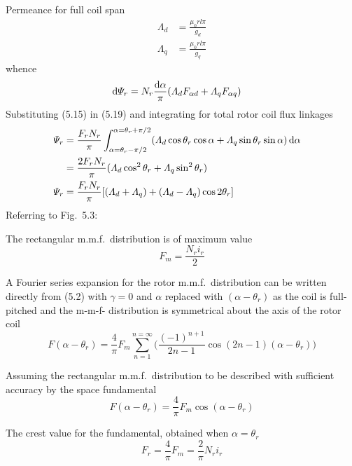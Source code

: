 \documentclass[a4paper,numbers=noenddot,12pt]{scrbook}
\begin{document}
Permeance for full coil span
\begin{equation}
    \begin{aligned}
        \varLambda_d & = \frac{\mu_0 r l \pi}{g_d}  \\
        \varLambda_q & = \frac{\mu_0 r l \pi}{g_q} 
    \end{aligned}
\end{equation}
whence
\begin{align}
    \dif \varPsi_r & = N_r \frac{\dif \alpha}{\pi} (\varLambda_d F_{\alpha d} + \varLambda_q F_{\alpha q})
\end{align} 
Substituting (5.15) in (5.19) and integrating for total rotor coil flux linkages
\begin{align}
    \varPsi_r & = \frac{F_r N_r}{\pi} \int_{\alpha = \theta_r  - \pi/2}^{\alpha = \theta_r  + \pi/2} (\varLambda_d \cos \theta_r \cos\alpha + \varLambda_q \sin \theta_r \sin \alpha) \dif \alpha && \\
    & = \frac{2 F_r N_r}{\pi} (\varLambda_d \cos^2 \theta_r + \varLambda_q \sin^2 \theta_r) && \nonumber \\
    \varPsi_r & = \frac{F_r N_r}{\pi} [(\varLambda_d + \varLambda_q) + (\varLambda_d - \varLambda_q)\cos 2 \theta_r ] &&
\end{align}
Referring to Fig.\ 5.3:

\noindent
The rectangular m.m.f.\ distribution is of maximum value
\begin{equation*}
    F_m=\frac{N_r i_r}{2}
\end{equation*}

A Fourier series expansion for the rotor m.m.f.\ distribution can be written directly from (5.2) with $\gamma=0$ and $\alpha$ replaced with $(\alpha - \theta_r)$ as the coil is full-pitched and the m-m-f- distribution is symmetrical about the axis of the rotor coil
\begin{equation*}
    F(\alpha - \theta_r) = \frac{4}{\pi} F_m \displaystyle \sum_{n = 1}^{n = \infty} \bigg( \frac{{(-1)}^{n+1}}{2n - 1} \cos(2n - 1)(\alpha - \theta_r) \bigg)
\end{equation*}

Assuming the rectangular m.m.f.\ distribution to be described with sufficient accuracy by the space fundamental
\begin{equation}
    F(\alpha - \theta_r) = \frac{4}{\pi} F_m \cos(\alpha - \theta_r)
\end{equation}

The crest value for the fundamental, obtained when $\alpha = \theta_r$
\begin{equation}
    F_r = \frac{4}{\pi}F_m = \frac{2}{\pi} N_r i_r
\end{equation}
\end{document}
